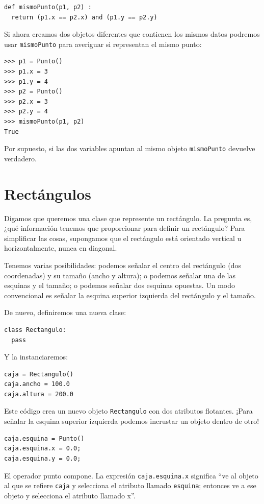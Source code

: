 \begin{lstlisting}
def mismoPunto(p1, p2) :
  return (p1.x == p2.x) and (p1.y == p2.y)
\end{lstlisting}
 Si ahora creamos dos objetos diferentes que contienen los mismos
datos podremos usar \texttt{mismoPunto} para averiguar si representan
el mismo punto:

\begin{lstlisting}
>>> p1 = Punto()
>>> p1.x = 3
>>> p1.y = 4
>>> p2 = Punto()
>>> p2.x = 3
>>> p2.y = 4
>>> mismoPunto(p1, p2)
True
\end{lstlisting}
 Por supuesto, si las dos variables apuntan al mismo objeto \texttt{mismoPunto}
devuelve verdadero.

\section{Rectángulos}

\label{embedded} 

Digamos que queremos una clase que represente un rectángulo. La pregunta
es, ¿qué información tenemos que proporcionar para definir un rectángulo?
Para simplificar las cosas, supongamos que el rectángulo está orientado
vertical u horizontalmente, nunca en diagonal.

Tenemos varias posibilidades: podemos señalar el centro del rectángulo
(dos coordenadas) y su tamaño (ancho y altura); o podemos señalar
una de las esquinas y el tamaño; o podemos señalar dos esquinas opuestas.
Un modo convencional es señalar la esquina superior izquierda del
rectángulo y el tamaño.

De nuevo, definiremos una nueva clase:
\begin{lstlisting}
class Rectangulo:	
  pass
\end{lstlisting}
Y la instanciaremos:
\begin{lstlisting}
caja = Rectangulo()
caja.ancho = 100.0
caja.altura = 200.0
\end{lstlisting}
Este código crea un nuevo objeto \texttt{Rectangulo} con dos atributos
flotantes. ¡Para señalar la esquina superior izquierda podemos incrustar
un objeto dentro de otro!
\begin{lstlisting}
caja.esquina = Punto()
caja.esquina.x = 0.0;
caja.esquina.y = 0.0;
\end{lstlisting}
El operador punto compone. La expresión \texttt{caja.esquina.x} significa
``ve al objeto al que se refiere \texttt{caja} y selecciona el atributo
llamado \texttt{esquina}; entonces ve a ese objeto y selecciona el
atributo llamado x''.

